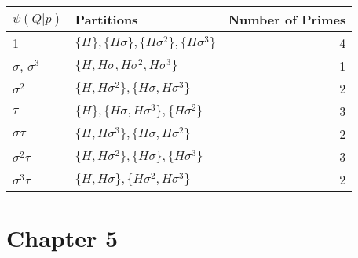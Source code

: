 \documentclass{article}
\newcommand{\w}[0]{\omega}
\newcommand{\Q}[0]{\mathbb{Q}}
\newcommand{\Z}[0]{\mathbb{Z}}
\newcommand{\gal}[2]{\text{Gal}(#1 / #2)}
\begin{document}
\begin{enumerate}
\begin{tabular}{|l|l|r|}
    \hline
    $\psi(Q|p)$ & Partitions & Number of Primes \\
    \hline
    1 & $\{H\}, \{H\sigma\}, \{H\sigma^2\}, \{H\sigma^3\}$ & 4 \\
    $\sigma$, $\sigma^3$ & $\{H, H\sigma, H\sigma^2, H\sigma^3\}$ & 1\\
    $\sigma^2$ & $\{H, H\sigma^2\}, \{H\sigma, H\sigma^3\}$ & 2\\
    $\tau$ & $\{H\}, \{H\sigma, H\sigma^3\}, \{H\sigma^2\}$ & 3 \\
    $\sigma\tau$ & $\{H, H\sigma^3\}, \{H\sigma, H\sigma^2\}$ & 2 \\
    $\sigma^2\tau$ & $\{H, H\sigma^2\}, \{H\sigma\}, \{H\sigma^3\}$ & 3 \\
    $\sigma^3\tau$ & $\{H, H\sigma\}, \{H\sigma^2, H\sigma^3\}$ & 2 \\
    \hline
\end{tabular}






\end{enumerate}

\section*{Chapter 5}
\end{document}
